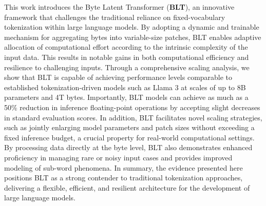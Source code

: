 This work introduces the Byte Latent Transformer (\textbf{BLT}), an innovative framework that challenges the traditional reliance on fixed-vocabulary tokenization within large language models. By adopting a dynamic and trainable mechanism for aggregating bytes into variable-size patches, {\textsc BLT} enables adaptive allocation of computational effort according to the intrinsic complexity of the input data. This results in notable gains in both computational efficiency and resilience to challenging inputs. Through a comprehensive scaling analysis, we show that {\textsc BLT} is capable of achieving performance levels comparable to established tokenization-driven models such as Llama 3 at scales of up to 8B parameters and 4T bytes. Importantly, BLT models can achieve as much as a 50\% reduction in inference floating-point operations by accepting slight decreases in standard evaluation scores. In addition, {\textsc BLT} facilitates novel scaling strategies, such as jointly enlarging model parameters and patch sizes without exceeding a fixed inference budget, a crucial property for real-world computational settings. By processing data directly at the byte level, {\textsc BLT} also demonstrates enhanced proficiency in managing rare or noisy input cases and provides improved modeling of sub-word phenomena. In summary, the evidence presented here positions {\textsc BLT} as a strong contender to traditional tokenization approaches, delivering a flexible, efficient, and resilient architecture for the development of large language models.

